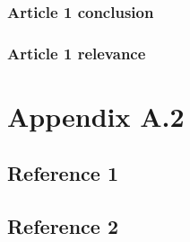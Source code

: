 \documentclass[a4paper]{article}
\begin{document}
  \subsubsection{Article 1 conclusion}
  \subsubsection{Article 1 relevance}
  \clearpage
  

  \section{Appendix A.2} %
  \subsection{Reference 1}
  \subsection{Reference 2}
  \clearpage
\end{document}
